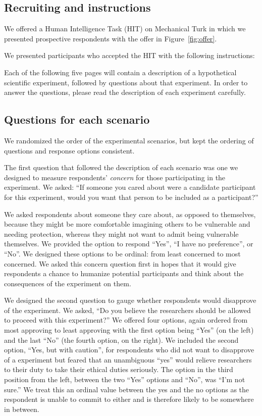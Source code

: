 \subsection{Recruiting and instructions}
We offered a Human Intelligence Task (HIT) on Mechanical Turk in which we presented prospective respondents with the offer in Figure~\ref{fig:offer}.

We presented participants who accepted the HIT with the following instructions:

\begin{packed_quotation}\footnotesize
Each of the following five pages will contain a description of a hypothetical scientific experiment, followed by questions about that experiment.
In order to answer the questions, please read the description of each experiment carefully.
\end{packed_quotation}
\subsection{Questions for each scenario}
We randomized the order of the experimental scenarios, but kept the ordering of questions and response options consistent.

The first question that followed the description of each scenario was one we designed to measure respondents' \emph{concern} for those participating in the experiment.  We asked: ``If someone you cared about were a candidate participant for this experiment, would you want that person to be included as a participant?''

We asked respondents about someone they care about, as opposed to themselves, because they might be more comfortable imagining others to be vulnerable and needing protection, whereas they might not want to admit being vulnerable themselves.  We provided the option to respond ``Yes'', ``I have no preference'', or ``No''.  We designed these options to be ordinal: from least concerned to most concerned.  We asked this concern question first in hopes that it would give respondents a chance to humanize potential participants and think about the consequences of the experiment on them.

We designed the second question to gauge whether respondents would disapprove of the experiment.  We asked, ``Do you believe the researchers should be allowed to proceed with this experiment?''  We offered four options, again ordered from most approving to least approving with the first option being ``Yes'' (on the left) and the last ``No'' (the fourth option, on the right).  We included the second option, ``Yes, but with caution'', for respondents who did not want to disapprove of a experiment but feared that an unambiguous ``yes'' would relieve researchers to their duty to take their ethical duties seriously.  The option in the third position from the left, between the two ``Yes'' options and ``No'', was ``I'm not sure.''  We treat this an ordinal value between the yes and the no options as the respondent is unable to commit to either and is therefore likely to be somewhere in between.

